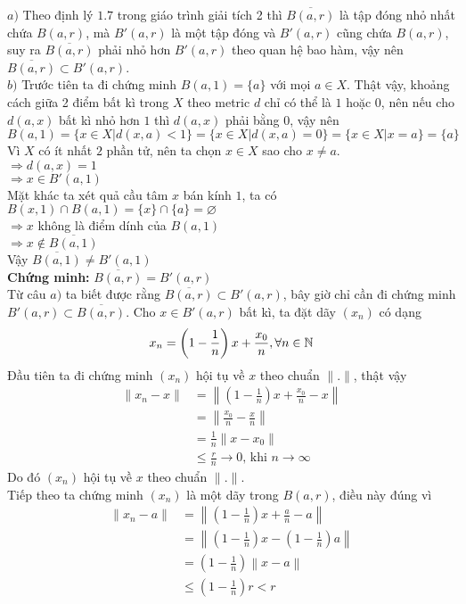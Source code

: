 \startproof
$a)$ Theo định lý $1.7$ trong giáo trình giải tích 2 thì $\overline{B(a,r)}$ là tập đóng nhỏ nhất chứa $B(a,r)$, mà $B'(a,r)$ là một tập đóng và $B'(a,r)$ cũng chứa $B(a,r)$, suy ra $\overline{B(a,r)}$ phải nhỏ hơn $B'(a,r)$ theo quan hệ bao hàm, vậy nên $\overline{B(a,r)} \subset B'(a,r)$. \QEDFill \\[3mm]
$b)$ Trước tiên ta đi chứng minh $B(a,1) = \{a\}$ với mọi $a \in X$. Thật vậy, khoảng cách giữa 2 điểm bất kì trong $X$ theo metric $d$ chỉ có thể là $1$ hoặc $0$, nên nếu cho $d(a,x)$ bất kì nhỏ hơn $1$ thì $d(a,x)$ phải bằng $0$, vậy nên $B(a, 1) = \{x \in X | d(x, a) < 1\} = \{x \in X | d(x, a) = 0\} = \{x \in X | x = a\} = \{a\}$\\[3mm]
Vì $X$ có ít nhất $2$ phần tử, nên ta chọn $x \in X$ sao cho $x \neq a$.\\
$\Rightarrow d(a,x)=1$\\
$\Rightarrow x \in B'(a,1)$\\
Mặt khác ta xét quả cầu tâm $x$ bán kính $1$, ta có $B(x,1) \cap B(a,1) = \{x\} \cap \{a\} = \varnothing$\\
$\Rightarrow x$ không là điểm dính của $B(a,1)$\\
$\Rightarrow x \notin \overline{B(a,1)}$\\
Vậy $\overline{B(a,1)} \neq B'(a,1)$ \QEDFill\\[3mm]
\textbf{Chứng minh:} $\overline{B(a,r)} = B'(a,r)$\\
Từ câu $a)$ ta biết được rằng $\overline{B(a,r)} \subset B'(a,r)$, bây giờ chỉ cần đi chứng minh $B'(a,r) \subset \overline{B(a,r)}$.
Cho $x \in B'(a,r)$ bất kì, ta đặt dãy $(x_n)$ có dạng
$$
    x_n = \left(1-\frac{1}{n}\right)x + \frac{x_0}{n}, \forall n \in \mathbb N
$$
Đầu tiên ta đi chứng minh $(x_n)$ hội tụ về $x$ theo chuẩn $\|.\|$, thật vậy
\begin{align*}
    \|x_n - x\| &= \left\|\left(1-\frac{1}{n}\right)x + \frac{x_0}{n} - x\right\|\\
    &= \left\|\frac{x_0}{n} - \frac{x}{n}\right\|\\
    &= \frac{1}{n} \|x-x_0\|\\
    &\leq \frac{r}{n} \longrightarrow 0 \text{,\ \ khi } n \longrightarrow \infty
\end{align*}
Do đó $(x_n)$ hội tụ về $x$ theo chuẩn $\|.\|$.\\
Tiếp theo ta chứng minh $(x_n)$ là một dãy trong $B(a,r)$, điều này đúng vì
\begin{align*}
    \|x_n-a\| &= \left\|\left(1-\frac{1}{n}\right)x + \frac{a}{n} - a\right\|\\
    &=\left\|\left(1-\frac{1}{n}\right)x - \left(1-\frac{1}{n}\right)a\right\|\\
    &= \left(1-\frac{1}{n}\right) \left\| x-a \right\|\\
    &\leq \left(1-\frac{1}{n}\right)r < r
\end{align*}
